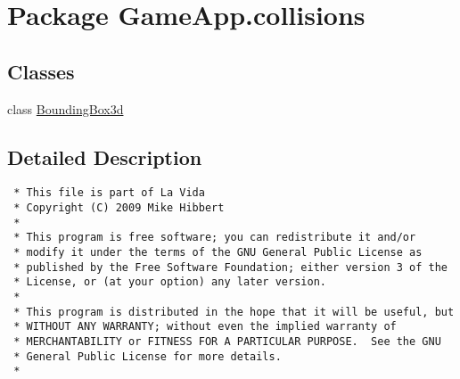 \hypertarget{namespaceGameApp_1_1collisions}{
\section{Package GameApp.collisions}
\label{namespaceGameApp_1_1collisions}
}


\subsection*{Classes}
\begin{CompactItemize}
\item 
class \hyperlink{classGameApp_1_1collisions_1_1BoundingBox3d}{BoundingBox3d}
\end{CompactItemize}


\subsection{Detailed Description}


\footnotesize\begin{verbatim}
 * This file is part of La Vida
 * Copyright (C) 2009 Mike Hibbert
 *
 * This program is free software; you can redistribute it and/or
 * modify it under the terms of the GNU General Public License as
 * published by the Free Software Foundation; either version 3 of the
 * License, or (at your option) any later version.
 *
 * This program is distributed in the hope that it will be useful, but
 * WITHOUT ANY WARRANTY; without even the implied warranty of
 * MERCHANTABILITY or FITNESS FOR A PARTICULAR PURPOSE.  See the GNU
 * General Public License for more details.
 *
\end{verbatim}
\normalsize
 